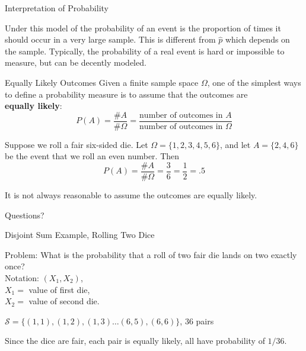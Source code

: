 \documentclass{beamer}
\newcommand{\qtns}[0]{\begin{center} Questions? \end{center}}
\newcommand{\nl}[1]{\vspace{#1 em}}
\begin{document}
\begin{frame}{Interpretation of Probability}

    Under this model of the probability of an event is the proportion of times it should occur in a very large sample. This is different from $\hat{p}$ which depends on the sample. Typically, the probability of a real event is hard or impossible to measure, but can be decently modeled.
\end{frame}

\begin{frame}{Equally Likely Outcomes}
    Given a finite sample space $\Omega$, one of the simplest ways to define a probability measure is to assume that the outcomes are \\{\bf equally likely}:
    $$P(A) = \frac{\# A}{\# \Omega} = \frac{\text{number of outcomes in $A$}}{\text{number of outcomes in $\Omega$}}$$
    
    \begin{example}
    Suppose we roll a fair six-sided die. Let $\Omega=\{1,2,3,4,5,6\}$, and let $A=\{2,4,6\}$ be the event that we roll an even number. Then
    $$P(A)=\frac{\# A}{\#\Omega}=\frac36=\frac12=.5$$
    \end{example}
    It is not always reasonable to assume the outcomes are equally likely. %
    \qtns
    \end{frame}

    \begin{frame}{Disjoint Sum Example, Rolling Two Dice}
        
        Problem: What is the probability that a roll of two fair die lands on two exactly once?\\
        \nl{0.5}
        Notation: $(X_1,X_2)$, \\
        $X_1 =$ value of first die, \\$X_2 =$ value of second die.\\
        \nl{0.5}
        \begin{center}
        $\mathcal{S} = \{(1,1), (1,2), (1,3) \ldots (6,5), (6,6)\}$, 36 pairs
        \end{center}
        Since the dice are fair, each pair is equally likely, all have probability of $1/36$.
    \end{frame}
\end{document}
